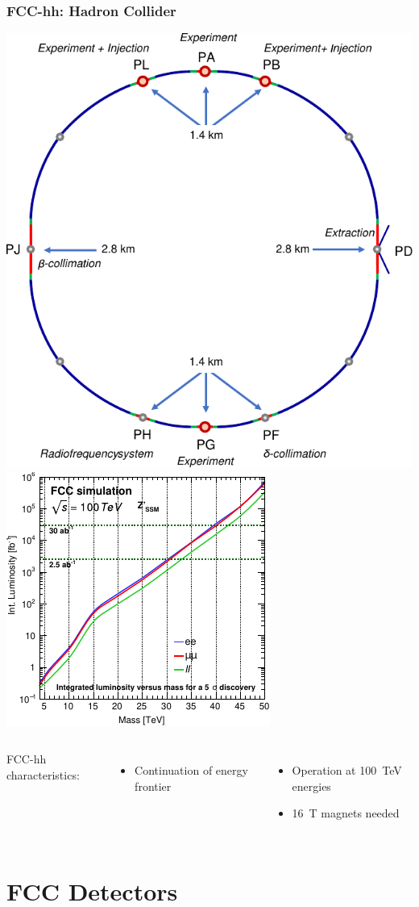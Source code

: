 \documentclass{beamer}
\newcommand{\bluetext}[1]{%
  \textcolor{myBlue}{#1}
}
\begin{document}
\begin{frame}
  \frametitle{FCC-hh: Hadron Collider}

  \includegraphics[width=.49\linewidth]{figures/FCC_hh_ring.pdf}
  \includegraphics[width=.49\linewidth]{figures/FCC_hh_Zprime_ll.pdf}

  \begin{columns}[c]
    \bluetext{FCC-hh characteristics:}
    \begin{itemize}
      \item Continuation of energy frontier
    \end{itemize}

    \begin{itemize}
      \item Operation at 100~TeV energies
      \item 16~T magnets needed
    \end{itemize}
  \end{columns}
\end{frame}


\section{FCC Detectors}
\end{document}
